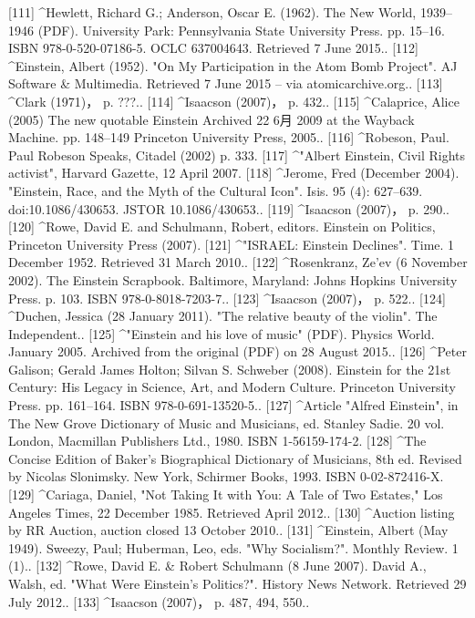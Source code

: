 [111]
^Hewlett, Richard G.; Anderson, Oscar E. (1962). The New World, 1939–1946 (PDF). University Park: Pennsylvania State University Press. pp. 15–16. ISBN 978-0-520-07186-5. OCLC 637004643. Retrieved 7 June 2015..
[112]
^Einstein, Albert (1952). "On My Participation in the Atom Bomb Project". AJ Software & Multimedia. Retrieved 7 June 2015 – via atomicarchive.org..
[113]
^Clark (1971)， p. ???..
[114]
^Isaacson (2007)， p. 432..
[115]
^Calaprice, Alice (2005) The new quotable Einstein Archived 22 6月 2009 at the Wayback Machine. pp. 148–149 Princeton University Press, 2005..
[116]
^Robeson, Paul. Paul Robeson Speaks, Citadel (2002) p. 333.
[117]
^"Albert Einstein, Civil Rights activist", Harvard Gazette, 12 April 2007.
[118]
^Jerome, Fred (December 2004). "Einstein, Race, and the Myth of the Cultural Icon". Isis. 95 (4): 627–639. doi:10.1086/430653. JSTOR 10.1086/430653..
[119]
^Isaacson (2007)， p. 290..
[120]
^Rowe, David E. and Schulmann, Robert, editors. Einstein on Politics, Princeton University Press (2007).
[121]
^"ISRAEL: Einstein Declines". Time. 1 December 1952. Retrieved 31 March 2010..
[122]
^Rosenkranz, Ze'ev (6 November 2002). The Einstein Scrapbook. Baltimore, Maryland: Johns Hopkins University Press. p. 103. ISBN 978-0-8018-7203-7..
[123]
^Isaacson (2007)， p. 522..
[124]
^Duchen, Jessica (28 January 2011). "The relative beauty of the violin". The Independent..
[125]
^"Einstein and his love of music" (PDF). Physics World. January 2005. Archived from the original (PDF) on 28 August 2015..
[126]
^Peter Galison; Gerald James Holton; Silvan S. Schweber (2008). Einstein for the 21st Century: His Legacy in Science, Art, and Modern Culture. Princeton University Press. pp. 161–164. ISBN 978-0-691-13520-5..
[127]
^Article "Alfred Einstein", in The New Grove Dictionary of Music and Musicians, ed. Stanley Sadie. 20 vol. London, Macmillan Publishers Ltd., 1980. ISBN 1-56159-174-2.
[128]
^The Concise Edition of Baker's Biographical Dictionary of Musicians, 8th ed. Revised by Nicolas Slonimsky. New York, Schirmer Books, 1993. ISBN 0-02-872416-X.
[129]
^Cariaga, Daniel, "Not Taking It with You: A Tale of Two Estates," Los Angeles Times, 22 December 1985. Retrieved April 2012..
[130]
^Auction listing by RR Auction, auction closed 13 October 2010..
[131]
^Einstein, Albert (May 1949). Sweezy, Paul; Huberman, Leo, eds. "Why Socialism?". Monthly Review. 1 (1)..
[132]
^Rowe, David E. & Robert Schulmann (8 June 2007). David A., Walsh, ed. "What Were Einstein's Politics?". History News Network. Retrieved 29 July 2012..
[133]
^Isaacson (2007)， p. 487, 494, 550..
